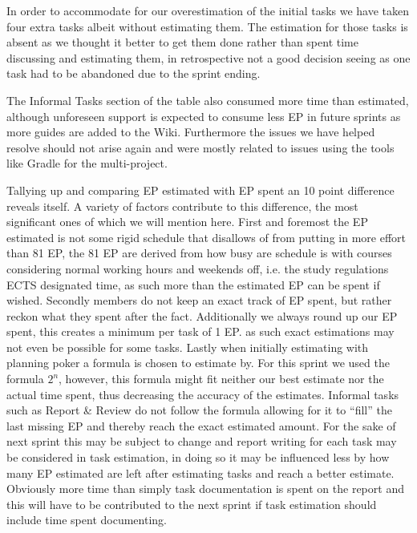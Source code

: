 In order to accommodate for our overestimation of the initial tasks we have taken four extra tasks albeit without estimating them.
The estimation for those tasks is absent as we thought it better to get them done rather than spent time discussing and estimating them, in retrospective not a good decision seeing as one task had to be abandoned due to the sprint ending.

The Informal Tasks section of the table also consumed more time than estimated, although unforeseen support is expected to consume less EP in future sprints as more guides are added to the Wiki.
Furthermore the issues we have helped resolve should not arise again and were mostly related to issues using the tools like Gradle for the multi-project.

Tallying up and comparing EP estimated with EP spent an 10 point difference reveals itself.
A variety of factors contribute to this difference, the most significant ones of which we will mention here.
First and foremost the EP estimated is not some rigid schedule that disallows of from putting in more effort than 81 EP, the 81 EP are derived from how busy are schedule is with courses considering normal working hours and weekends off, i.e. the study regulations ECTS designated time, as such more than the estimated EP can be spent if wished.
Secondly members do not keep an exact track of EP spent, but rather reckon what they spent after the fact.
Additionally  we always round up our EP spent, this creates a minimum per task of 1 EP.
as such exact estimations may not even be possible for some tasks. 
Lastly when initially estimating with planning poker a formula is chosen to estimate by. 
For this sprint we used the formula $2^n$, however, this formula might fit neither our best estimate nor the actual time spent, thus decreasing the accuracy of the estimates. 
Informal tasks such as Report \& Review do not follow the formula allowing for it to ``fill'' the last missing EP and thereby reach the exact estimated amount. 
For the sake of next sprint this may be subject to change and report writing for each task may be considered in task estimation, in doing so it may be influenced less by how many EP estimated are left after estimating tasks and reach a better estimate.
Obviously more time than simply task documentation is spent on the report and this will have to be contributed to the next sprint if task estimation should include time spent documenting.


